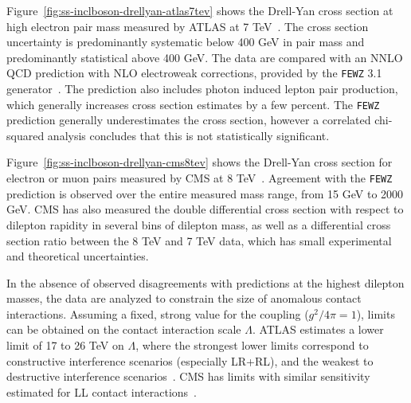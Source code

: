 Figure~\ref{fig:ss-inclboson-drellyan-atlas7tev} shows the Drell-Yan
cross section at high electron pair mass measured by ATLAS at 7
TeV~\cite{Aad:2013iua}.  The cross section uncertainty is
predominantly systematic below 400 GeV in pair mass and predominantly
statistical above 400 GeV.  The data are compared with an NNLO QCD
prediction with NLO electroweak corrections, provided by the
\texttt{FEWZ} 3.1
generator~\cite{Melnikov:2006kv,Gavin:2010az,Li:2012wna}.  The
prediction also includes photon induced lepton pair production, which
generally increases cross section estimates by a few percent. The
\texttt{FEWZ} prediction generally underestimates the cross section,
however a correlated chi-squared analysis concludes that this is not
statistically significant.

Figure~\ref{fig:ss-inclboson-drellyan-cms8tev} shows the Drell-Yan
cross section for electron or muon pairs measured by CMS at 8
TeV~\cite{CMS:2014jea}.  Agreement with the \texttt{FEWZ} prediction
is observed over the entire measured mass range, from 15 GeV to 2000
GeV.  CMS has also measured the double differential cross section with
respect to dilepton rapidity in several bins of dilepton mass, as well
as a differential cross section ratio between the 8 TeV and 7 TeV
data, which has small experimental and theoretical uncertainties.

In the absence of observed disagreements with predictions at the
highest dilepton masses, the data are analyzed to constrain the size
of anomalous contact interactions. Assuming a fixed, strong value for
the coupling ($g^2/4\pi = 1$), limits can be obtained on the contact
interaction scale $\Lambda$.  ATLAS estimates a lower limit of 17 to
26 TeV on $\Lambda$, where the strongest lower limits correspond to
constructive interference scenarios (especially LR+RL), and the
weakest to destructive interference scenarios~\cite{Aad:2014wca}. CMS
has limits with similar sensitivity estimated for LL contact
interactions~\cite{Khachatryan:2014fba}.


